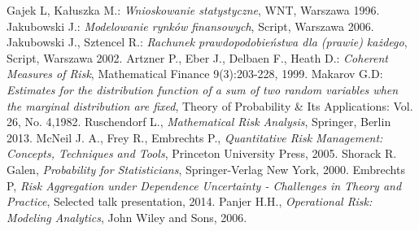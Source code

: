 \documentclass[12pt,a4paper,openany]{book}
\begin{document}


\begin{thebibliography}{a,b,c}
\bibitem[1]{}  Gajek L, Kałuszka M.: {\it Wnioskowanie statystyczne}, WNT, Warszawa 1996.
\bibitem[2]{}  Jakubowski J.: {\it Modelowanie rynków finansowych}, Script, Warszawa 2006.
\bibitem[3]{}  Jakubowski J., Sztencel R.: {\it Rachunek prawdopodobieństwa dla (prawie) każdego}, Script, Warszawa 2002.
\bibitem[4]{}  Artzner P., Eber J., Delbaen F., Heath D.: {\it Coherent Measures of Risk}, Mathematical Finance 9(3):203-228, 1999.
\bibitem[5]{}  Makarov G.D: {\it Estimates for the distribution function of a sum of two random variables when the marginal distribution are fixed}, Theory of Probability \& Its Applications: Vol. 26, No. 4,1982.
\bibitem[5]{}  Ruschendorf L., {\it Mathematical Risk Analysis}, Springer, Berlin 2013.
\bibitem[6]{}  McNeil J. A., Frey R., Embrechts P., {\it Quantitative Risk Management: Concepts, Techniques and Tools}, Princeton University Press, 2005.
\bibitem[7]{}  Shorack R. Galen, {\it Probability for Statisticians}, Springer-Verlag New York, 2000.
\bibitem[8]{}  Embrechts P, {\it Risk Aggregation under Dependence Uncertainty - Challenges in Theory and Practice}, Selected talk presentation, 2014.
\bibitem[9]{}  Panjer H.H., {\it Operational Risk: Modeling Analytics}, John Wiley and Sons, 2006.

\end{thebibliography}
\end{document}
